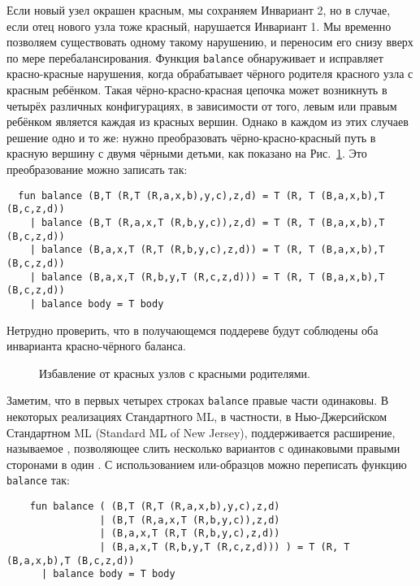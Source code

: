 Если новый узел окрашен красным, мы сохраняем Инвариант 2, но в
случае, если отец нового узла тоже красный, нарушается Инвариант 1. Мы
временно позволяем существовать одному такому нарушению, и переносим
его снизу вверх по мере перебалансирования. Функция
\lstinline!balance! обнаруживает и исправляет красно-красные нарушения,
когда обрабатывает чёрного родителя красного узла с красным
ребёнком. Такая чёрно-красно-красная цепочка может возникнуть в
четырёх различных конфигурациях, в зависимости от того, левым или
правым ребёнком является каждая из красных вершин. Однако в каждом из
этих случаев решение одно и то же: нужно преобразовать
чёрно-красно-красный путь в красную вершину с двумя чёрными детьми,
как показано на Рис.~\ref{fig:3.5}.  Это преобразование можно записать
так:
\begin{lstlisting}
  fun balance (B,T (R,T (R,a,x,b),y,c),z,d) = T (R, T (B,a,x,b),T (B,c,z,d))
    | balance (B,T (R,a,x,T (R,b,y,c)),z,d) = T (R, T (B,a,x,b),T (B,c,z,d))
    | balance (B,a,x,T (R,T (R,b,y,c),z,d)) = T (R, T (B,a,x,b),T (B,c,z,d))
    | balance (B,a,x,T (R,b,y,T (R,c,z,d))) = T (R, T (B,a,x,b),T (B,c,z,d))
    | balance body = T body
\end{lstlisting}
Нетрудно проверить, что в получающемся поддереве будут соблюдены оба
инварианта красно-чёрного баланса.

\begin{figure}
  \centering
  
  \caption{Избавление от красных узлов с красными родителями.}
  \label{fig:3.5}
\end{figure}

\begin{remark}
  Заметим, что в первых четырех строках \lstinline!balance! правые
  части одинаковы. В некоторых реализациях Стандартного ML, в
  частности, в Нью-Джерсийском Стандартном ML (Standard ML of New
  Jersey), поддерживается расширение, называемое
  , позволяющее слить несколько
  вариантов с одинаковыми правыми сторонами в один
  \cite{FahndrichBoyland1997}. С использованием или-образцов можно
  переписать функцию \lstinline!balance! так:
  \begin{lstlisting}
    fun balance ( (B,T (R,T (R,a,x,b),y,c),z,d) 
                | (B,T (R,a,x,T (R,b,y,c)),z,d) 
                | (B,a,x,T (R,T (R,b,y,c),z,d)) 
                | (B,a,x,T (R,b,y,T (R,c,z,d))) ) = T (R, T (B,a,x,b),T (B,c,z,d))
      | balance body = T body
  \end{lstlisting}
\end{remark}

